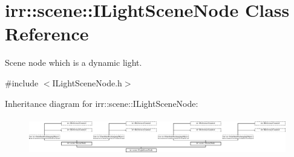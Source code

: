 \hypertarget{classirr_1_1scene_1_1ILightSceneNode}{}\section{irr\+:\+:scene\+:\+:I\+Light\+Scene\+Node Class Reference}
\label{classirr_1_1scene_1_1ILightSceneNode}


Scene node which is a dynamic light.  




{\ttfamily \#include $<$I\+Light\+Scene\+Node.\+h$>$}

Inheritance diagram for irr\+:\+:scene\+:\+:I\+Light\+Scene\+Node\+:\begin{figure}[H]
\begin{center}
\leavevmode
\includegraphics[height=1.682692cm]{classirr_1_1scene_1_1ILightSceneNode}
\end{center}
\end{figure}
